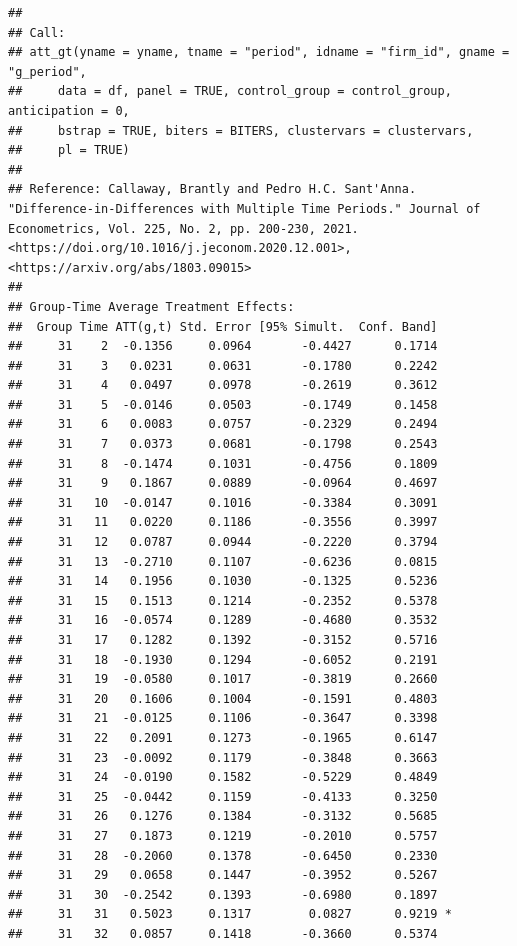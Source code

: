 \documentclass[
]{article}
\begin{document}
\begin{verbatim}
## 
## Call:
## att_gt(yname = yname, tname = "period", idname = "firm_id", gname = "g_period", 
##     data = df, panel = TRUE, control_group = control_group, anticipation = 0, 
##     bstrap = TRUE, biters = BITERS, clustervars = clustervars, 
##     pl = TRUE)
## 
## Reference: Callaway, Brantly and Pedro H.C. Sant'Anna.  "Difference-in-Differences with Multiple Time Periods." Journal of Econometrics, Vol. 225, No. 2, pp. 200-230, 2021. <https://doi.org/10.1016/j.jeconom.2020.12.001>, <https://arxiv.org/abs/1803.09015> 
## 
## Group-Time Average Treatment Effects:
##  Group Time ATT(g,t) Std. Error [95% Simult.  Conf. Band]  
##     31    2  -0.1356     0.0964       -0.4427      0.1714  
##     31    3   0.0231     0.0631       -0.1780      0.2242  
##     31    4   0.0497     0.0978       -0.2619      0.3612  
##     31    5  -0.0146     0.0503       -0.1749      0.1458  
##     31    6   0.0083     0.0757       -0.2329      0.2494  
##     31    7   0.0373     0.0681       -0.1798      0.2543  
##     31    8  -0.1474     0.1031       -0.4756      0.1809  
##     31    9   0.1867     0.0889       -0.0964      0.4697  
##     31   10  -0.0147     0.1016       -0.3384      0.3091  
##     31   11   0.0220     0.1186       -0.3556      0.3997  
##     31   12   0.0787     0.0944       -0.2220      0.3794  
##     31   13  -0.2710     0.1107       -0.6236      0.0815  
##     31   14   0.1956     0.1030       -0.1325      0.5236  
##     31   15   0.1513     0.1214       -0.2352      0.5378  
##     31   16  -0.0574     0.1289       -0.4680      0.3532  
##     31   17   0.1282     0.1392       -0.3152      0.5716  
##     31   18  -0.1930     0.1294       -0.6052      0.2191  
##     31   19  -0.0580     0.1017       -0.3819      0.2660  
##     31   20   0.1606     0.1004       -0.1591      0.4803  
##     31   21  -0.0125     0.1106       -0.3647      0.3398  
##     31   22   0.2091     0.1273       -0.1965      0.6147  
##     31   23  -0.0092     0.1179       -0.3848      0.3663  
##     31   24  -0.0190     0.1582       -0.5229      0.4849  
##     31   25  -0.0442     0.1159       -0.4133      0.3250  
##     31   26   0.1276     0.1384       -0.3132      0.5685  
##     31   27   0.1873     0.1219       -0.2010      0.5757  
##     31   28  -0.2060     0.1378       -0.6450      0.2330  
##     31   29   0.0658     0.1447       -0.3952      0.5267  
##     31   30  -0.2542     0.1393       -0.6980      0.1897  
##     31   31   0.5023     0.1317        0.0827      0.9219 *
##     31   32   0.0857     0.1418       -0.3660      0.5374  

\end{verbatim}
\end{document}
